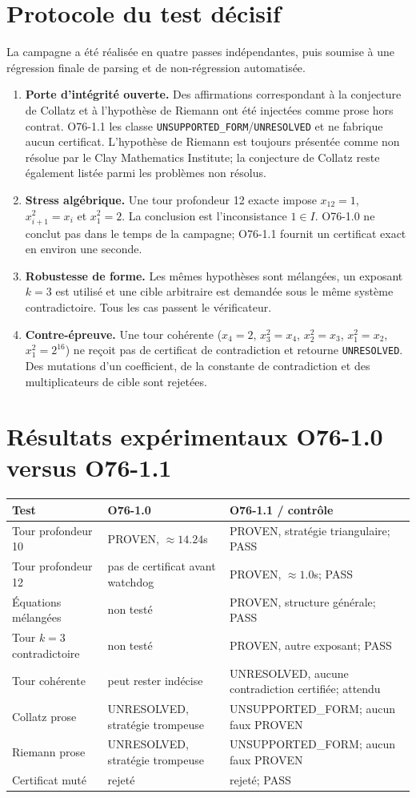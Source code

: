 \documentclass[11pt,a4paper]{article}
\begin{document}
\section{Protocole du test décisif}
La campagne a été réalisée en quatre passes indépendantes, puis soumise à une régression finale de parsing et de non-régression automatisée.
\begin{enumerate}
\item \textbf{Porte d'intégrité ouverte.} Des affirmations correspondant à la conjecture de Collatz et à l'hypothèse de Riemann ont été injectées comme prose hors contrat. O76-1.1 les classe \texttt{UNSUPPORTED\_FORM}/\texttt{UNRESOLVED} et ne fabrique aucun certificat. L'hypothèse de Riemann est toujours présentée comme non résolue par le Clay Mathematics Institute; la conjecture de Collatz reste également listée parmi les problèmes non résolus.
\item \textbf{Stress algébrique.} Une tour profondeur 12 exacte impose $x_{12}=1$, $x_{i+1}^2=x_i$ et $x_1^2=2$. La conclusion est l'inconsistance $1\in I$. O76-1.0 ne conclut pas dans le temps de la campagne; O76-1.1 fournit un certificat exact en environ une seconde.
\item \textbf{Robustesse de forme.} Les mêmes hypothèses sont mélangées, un exposant $k=3$ est utilisé et une cible arbitraire est demandée sous le même système contradictoire. Tous les cas passent le vérificateur.
\item \textbf{Contre-épreuve.} Une tour cohérente ($x_4=2$, $x_3^2=x_4$, $x_2^2=x_3$, $x_1^2=x_2$, $x_1^2=2^{16}$) ne reçoit pas de certificat de contradiction et retourne \texttt{UNRESOLVED}. Des mutations d'un coefficient, de la constante de contradiction et des multiplicateurs de cible sont rejetées.
\end{enumerate}

\section{Résultats expérimentaux O76-1.0 versus O76-1.1}
\begin{longtable}{p{}p{}p{}}
\toprule
Test & O76-1.0 & O76-1.1 / contrôle\\
\midrule
Tour profondeur 10 & PROVEN, $\approx14.24$s & PROVEN, stratégie triangulaire; PASS\\
Tour profondeur 12 & pas de certificat avant watchdog & PROVEN, $\approx1.0$s; PASS\\
Équations mélangées & non testé & PROVEN, structure générale; PASS\\
Tour $k=3$ contradictoire & non testé & PROVEN, autre exposant; PASS\\
Tour cohérente & peut rester indécise & UNRESOLVED, aucune contradiction certifiée; attendu\\
Collatz prose & UNRESOLVED, stratégie trompeuse & UNSUPPORTED\_FORM; aucun faux PROVEN\\
Riemann prose & UNRESOLVED, stratégie trompeuse & UNSUPPORTED\_FORM; aucun faux PROVEN\\
Certificat muté & rejeté & rejeté; PASS\\
\bottomrule\end{longtable}
\end{document}
